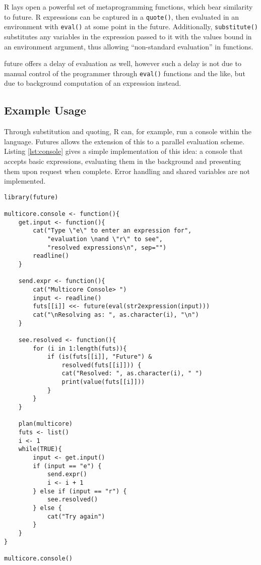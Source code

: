R lays open a powerful set of metaprogramming functions, which bear
similarity to future. R expressions can be captured in a
\texttt{quote()}, then evaluated in an
environment with \texttt{eval()} at some point
in the future. Additionally,
\texttt{substitute()} substitutes any variables
in the expression passed to it with the values bound in an environment
argument, thus allowing ``non-standard evaluation'' in functions.

future offers a delay of evaluation as well, however such a delay is not
due to manual control of the programmer through
\texttt{eval()} functions and the like, but due
to background computation of an expression instead.

\hypertarget{sec:examples}{%
    \subsection{Example Usage}\label{sec:examples}}

Through substitution and quoting, R can, for example, run a console
within the language. Futures allows the extension of this to a parallel
evaluation scheme. Listing \ref{lst:console} gives a simple
implementation of this idea: a console that accepts basic expressions,
evaluating them in the background and presenting them upon request when
complete. Error handling and shared variables are not implemented.

\begin{listing}
    \begin{verbatim}
library(future)

multicore.console <- function(){
    get.input <- function(){
        cat("Type \"e\" to enter an expression for",
            "evaluation \nand \"r\" to see",
            "resolved expressions\n", sep="")
        readline()
    }

    send.expr <- function(){
        cat("Multicore Console> ")
        input <- readline()
        futs[[i]] <<- future(eval(str2expression(input)))
        cat("\nResolving as: ", as.character(i), "\n")
    }

    see.resolved <- function(){
        for (i in 1:length(futs)){
            if (is(futs[[i]], "Future") &
                resolved(futs[[i]])) {
                cat("Resolved: ", as.character(i), " ")
                print(value(futs[[i]]))
            }
        }
    }

    plan(multicore)
    futs <- list()
    i <- 1
    while(TRUE){
        input <- get.input()
        if (input == "e") {
            send.expr()
            i <- i + 1
        } else if (input == "r") {
            see.resolved()
        } else {
            cat("Try again")
        }
    }
}

multicore.console()
\end{verbatim}
    \caption{Usage of future to implement a basic multicore console}
    \label{lst:console}
\end{listing}

